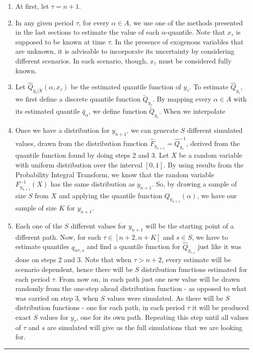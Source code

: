 \begin{enumerate}
	
\item At first, let $\tau = n + 1$.

\item In any given period $\tau$, for every $\alpha \in A$, we use one of the methods presented in the last sections to estimate the value of each $\alpha$-quantile.
Note that $x_{\tau}$ is supposed to be known at time $\tau$. In the presence of exogenous variables that are unknown, it is advisable to incorporate its uncertainty by considering different scenarios. In each scenario, though, $x_{\tau}$ must be considered fully known. 
 
\item Let $\hat{Q}_{y_{\tau}|X}(\alpha,x_\tau)$ be the estimated quantile function of ${y}_{\tau}$. 
To estimate $\hat{Q}_{y_{\tau}}$, we first define a discrete quantile function $\tilde{Q}_{y_\tau}$. By mapping every $\alpha \in A$ with its estimated quantile $\hat{q}_{\alpha}$, we define function $\tilde{Q}_{y_{\tau}}$. When we interpolate 


\item Once we have a distribution for $y_{n+1}$, we can generate $S$ different simulated values, drawn from the distribution function $\hat{F}_{y_{n+1}} = \hat{Q}^{-1}_{y_{\tau}}$, derived from the quantile function found by doing steps 2 and 3. 
Let $X$ be a random variable with uniform distribution over the interval $[0,1]$. By using results from the Probability Integral Transform, we know that the random variable $F^{-1}_{y_{n+1}}(X)$ has the same distribution as $y_{n+1}$. So, by drawing a sample of size $S$ from $X$ and applying the quantile function $Q_{y_{n+1}}(\alpha)$, we have our sample of size $K$ for $y_{n+1}$.

\item Each one of the $S$ different values for $y_{n+1}$ will be the starting point of a different path. Now, for each $\tau \in [n+2,n+K]$ and $s \in S$, we have to estimate quantiles $q_{\alpha \tau, s}$ and find a quantile function for $\hat{Q}_{y_{\tau,s}}$ just like it was done on steps 2 and 3.
Note that when $\tau > n+2$, every estimate will be scenario dependent, hence there will be $S$ distribution functions estimated for each period $\tau$. From now on, in each path just one new value will be drawn randomly from the one-step ahead distribution function - as opposed to what was carried on step 3, when $S$ values were simulated. As there will be $S$ distribution functions - one for each path, in each period $\tau$ it will be produced exact $S$ values for $y_\tau$, one for its own path. Repeating this step until all values of $\tau$ and $s$ are simulated will give us the full simulations that we are looking for.
\end{enumerate}

\noindent\rule{\columnwidth}{1pt}



